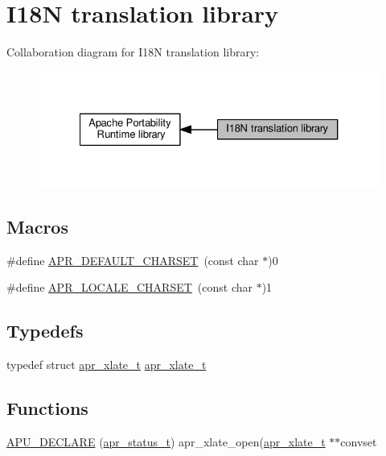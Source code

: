 \hypertarget{group__APR__XLATE}{}\section{I18N translation library}
\label{group__APR__XLATE}
Collaboration diagram for I18N translation library\+:
\nopagebreak
\begin{figure}[H]
\begin{center}
\leavevmode
\includegraphics[width=327pt]{group__APR__XLATE}
\end{center}
\end{figure}
\subsection*{Macros}
\begin{DoxyCompactItemize}
\item 
\#define \hyperlink{group__APR__XLATE_ga3276c680eb0917ff51ff22c9b9959fa9}{A\+P\+R\+\_\+\+D\+E\+F\+A\+U\+L\+T\+\_\+\+C\+H\+A\+R\+S\+ET}~(const char $\ast$)0
\item 
\#define \hyperlink{group__APR__XLATE_ga0e46c333fb1c900f0dd4a78664f5a0de}{A\+P\+R\+\_\+\+L\+O\+C\+A\+L\+E\+\_\+\+C\+H\+A\+R\+S\+ET}~(const char $\ast$)1
\end{DoxyCompactItemize}
\subsection*{Typedefs}
\begin{DoxyCompactItemize}
\item 
typedef struct \hyperlink{group__APR__XLATE_ga069dabbadc30e3a4157c38104a250e77}{apr\+\_\+xlate\+\_\+t} \hyperlink{group__APR__XLATE_ga069dabbadc30e3a4157c38104a250e77}{apr\+\_\+xlate\+\_\+t}
\end{DoxyCompactItemize}
\subsection*{Functions}
\begin{DoxyCompactItemize}
\item 
\hyperlink{group__APR__XLATE_ga4757f7c9805448839cd650261a82fab7}{A\+P\+U\+\_\+\+D\+E\+C\+L\+A\+RE} (\hyperlink{group__apr__errno_gaa5105fa83cc322f09382292db8b47593}{apr\+\_\+status\+\_\+t}) apr\+\_\+xlate\+\_\+open(\hyperlink{group__APR__XLATE_ga069dabbadc30e3a4157c38104a250e77}{apr\+\_\+xlate\+\_\+t} $\ast$$\ast$convset
\end{DoxyCompactItemize}
